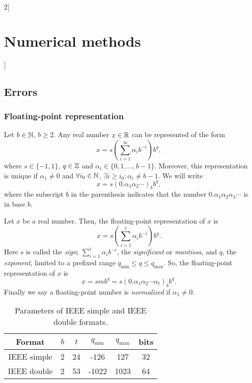 \documentclass[../../../main.tex]{subfiles}
\begin{document}
\begin{multicols}{2}[\section{Numerical methods}]
\subsection{Errors}
\subsubsection*{Floating-point representation}
\begin{theorem}
    Let $b\in\mathbb{N}$, $b\geq 2$. Any real number $x\in\mathbb{R}$ can be represented of the form 
    \begin{equation*}
        x=s\left(\sum_{i=1}^\infty\alpha_ib^{-i}\right)b^q,
    \end{equation*} where $s\in\{-1,1\}$, $q\in\mathbb{Z}$ and $\alpha_i\in\{0,1,\ldots,b-1\}$. Moreover, this representation is unique if $\alpha_1\ne0$ and $\forall i_0\in\mathbb{N}$, $\exists i\geq i_0:\alpha_i\ne b-1$. We will write $$x=s(0.\alpha_1\alpha_2\cdots)_bb^q,$$ where the subscript $b$ in the parenthesis indicates that the number $0.\alpha_1\alpha_2\alpha_3\cdots$ is in base $b$.
\end{theorem}
\begin{definition}
    Let $x$ be a real number. Then, the floating-point representation of $x$ is $$x=s\left(\sum_{i=1}^t\alpha_ib^{-i}\right)b^q.$$ Here $s$ is called the \textit{sign}; $\sum_{i=1}^t\alpha_ib^{-i}$, the \textit{significant} or \textit{mantissa}, and $q$, the \textit{exponent}, limited to a prefixed range $q_\text{min}\leq q\leq q_\text{max}$. So, the floating-point representation of $x$ is $$x=smb^q=s(0.\alpha_1\alpha_2\cdots\alpha_t)_bb^q.$$ Finally we say a floating-point number is \textit{normalized} if $\alpha_1\ne0$.
\end{definition}
\begin{table}[ht]
    \centering
    \begin{tabular}{c|ccccc}
        Format & $b$ & $t$ & $q_\text{min}$ & $q_\text{max}$ & bits \\
        \hline\hline
        IEEE simple & 2 & 24 & -126 & 127 & 32\\
        IEEE double & 2 & 53 & -1022 & 1023 & 64
    \end{tabular}
    \caption{Parameters of IEEE simple and IEEE double formats.}
    \label{tab:my_label}

\end{table}
\end{multicols}
\end{document}

